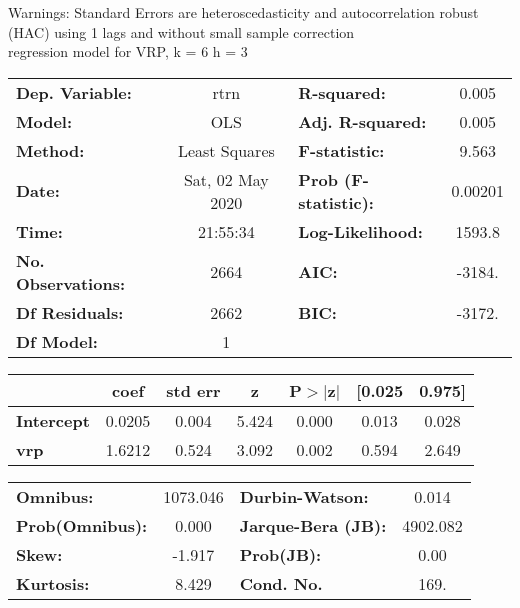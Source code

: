 Warnings: \newline
 [1] Standard Errors are heteroscedasticity and autocorrelation robust (HAC) using 1 lags and without small sample correction\\ 

regression model for VRP, k = 6 h = 3\begin{center}
\begin{tabular}{lclc}
\toprule
\textbf{Dep. Variable:}    &       rtrn       & \textbf{  R-squared:         } &     0.005   \\
\textbf{Model:}            &       OLS        & \textbf{  Adj. R-squared:    } &     0.005   \\
\textbf{Method:}           &  Least Squares   & \textbf{  F-statistic:       } &     9.563   \\
\textbf{Date:}             & Sat, 02 May 2020 & \textbf{  Prob (F-statistic):} &  0.00201    \\
\textbf{Time:}             &     21:55:34     & \textbf{  Log-Likelihood:    } &    1593.8   \\
\textbf{No. Observations:} &        2664      & \textbf{  AIC:               } &    -3184.   \\
\textbf{Df Residuals:}     &        2662      & \textbf{  BIC:               } &    -3172.   \\
\textbf{Df Model:}         &           1      & \textbf{                     } &             \\
\bottomrule
\end{tabular}
\begin{tabular}{lcccccc}
                   & \textbf{coef} & \textbf{std err} & \textbf{z} & \textbf{P$> |$z$|$} & \textbf{[0.025} & \textbf{0.975]}  \\
\midrule
\textbf{Intercept} &       0.0205  &        0.004     &     5.424  &         0.000        &        0.013    &        0.028     \\
\textbf{vrp}       &       1.6212  &        0.524     &     3.092  &         0.002        &        0.594    &        2.649     \\
\bottomrule
\end{tabular}
\begin{tabular}{lclc}
\textbf{Omnibus:}       & 1073.046 & \textbf{  Durbin-Watson:     } &    0.014  \\
\textbf{Prob(Omnibus):} &   0.000  & \textbf{  Jarque-Bera (JB):  } & 4902.082  \\
\textbf{Skew:}          &  -1.917  & \textbf{  Prob(JB):          } &     0.00  \\
\textbf{Kurtosis:}      &   8.429  & \textbf{  Cond. No.          } &     169.  \\
\bottomrule
\end{tabular}
\end{center}


